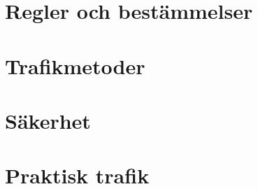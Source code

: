 \documentclass[a4paper,11pt,twoside]{book}
\begin{document}
\chapter{Regler och bestämmelser}

\chapter{Trafikmetoder}

\chapter{Säkerhet}

\chapter{Praktisk trafik}
\end{document}
